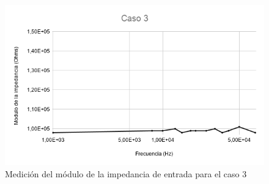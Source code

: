 \begin{figure}[H]
\begin{centering}
\includegraphics[scale=0.5]{../Ex1/iA/Resources1a/zinpm3_med}
\par\end{centering}
\caption{Medición del módulo de la impedancia de entrada para el caso 3}

\end{figure}

